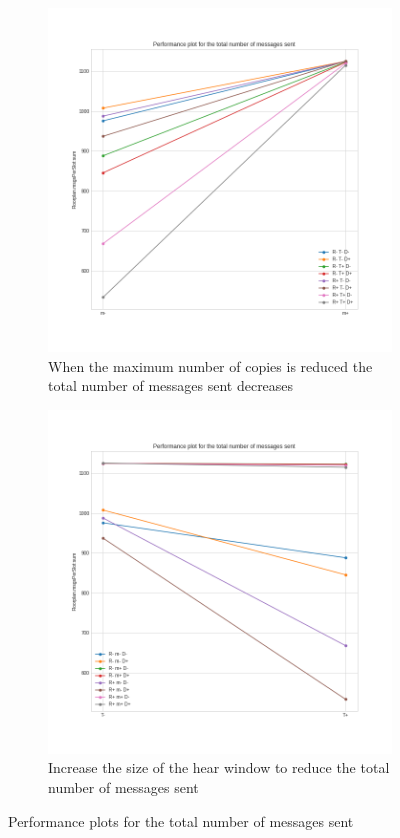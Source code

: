 \begin{figure}[htb]
	\centering
	\begin{subfigure}[b]{0.49\textwidth}
		\centering
		\includegraphics[width=\textwidth]{img/hd/messages-m-perfplot}
		\caption{When the maximum number of copies is reduced the total
		number of messages sent decreases}\label{subfig:hdperfmessagesm}
	\end{subfigure}
	\begin{subfigure}[b]{0.49\textwidth}
		\centering
		\includegraphics[width=\textwidth]{img/hd/messages-T-perfplot}
		\caption{Increase the size of the hear window to reduce the
		total number of messages sent}\label{subfig:hdperfmessagesT}
	\end{subfigure}
	\caption{Performance plots for the total number of messages
	sent}\label{fig:hdperfmessages}
\end{figure}
